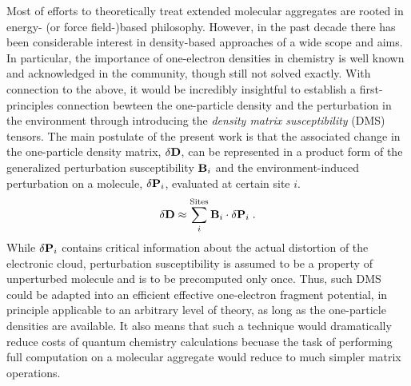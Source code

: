 \documentclass[aip,amsmath,amssymb,reprint,floatfix]{revtex4-1}
\begin{document}
Most of efforts to theoretically treat extended molecular aggregates are rooted in 
energy\hyp{} (or force field\hyp{})based philosophy. However,
in the past decade there has been considerable interest in density\hyp{}based approaches
of a wide scope and aims.\cite{Piquemal.Cisneros.Reinhardt.Gresh.Darden.JCP.2006,
Mandado.Hermida-Ramon.JCTC.2011,
Sun.Chan.ACR.2016,
Hedegard.Reiher.JCTC.2016} 
In particular, the importance of
one\hyp{}electron densities in chemistry is well known and acknowledged in the community,
though still not solved exactly.\cite{Holas.March.PhysRevA.1991}
With connection to the above, it would be incredibly insightful 
to establish a first\hyp{}principles connection bewteen the one\hyp{}particle
density and the perturbation in the environment through introducing the
\emph{density matrix susceptibility} (DMS) tensors. 
The main postulate of the present work is that the associated change 
in the one\hyp{}particle density matrix, $\delta {\bf D}$, can be
represented in a product form of the generalized perturbation susceptibility ${\bf B}_i$
and the environment\hyp{}induced perturbation on a molecule, $\delta {\bf P}_i$,
evaluated at certain site $i$.
%
\begin{equation*} \label{e:initial-model}
  \delta {\bf D} \approx \sum_i^{\text{Sites}} {\bf B}_i
  \cdot  \delta {\bf P}_i \;.
\end{equation*}
%
While $\delta {\bf P}_i$ contains critical information 
about the actual distortion of the electronic cloud,
perturbation susceptibility is assumed to be a property of unperturbed 
molecule and is to be precomputed only once. 
Thus, such DMS could be adapted into an efficient effective 
one\hyp{}electron fragment potential, in principle applicable to an arbitrary
level of theory, as long as the one\hyp{}particle densities are available.
It also means that such a technique would dramatically reduce costs of quantum chemistry calculations
becuase the task of performing full computation on a molecular aggregate
would reduce to much simpler matrix operations.
\end{document}
